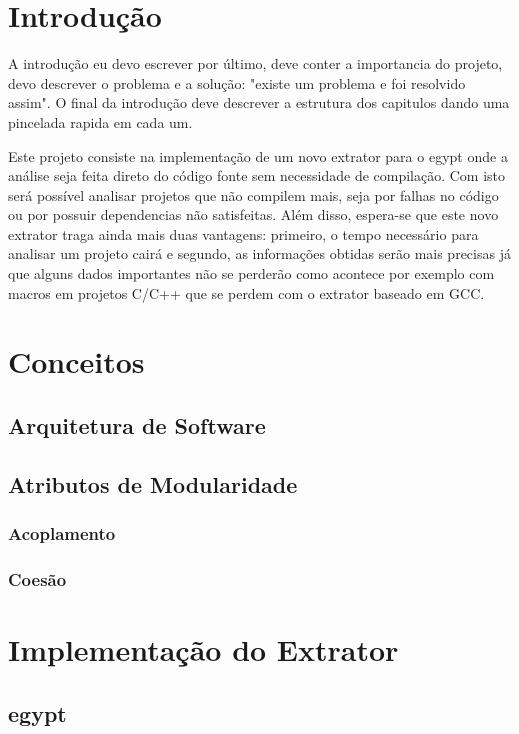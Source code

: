 \chapter{Introdução}

A introdução eu devo escrever por último, deve conter a importancia do projeto,
devo descrever o problema e a solução: "existe um problema e foi resolvido
assim". O final da introdução deve descrever a estrutura dos capitulos dando
uma pincelada rapida em cada um.

Este projeto consiste na implementação de um novo extrator para o egypt onde a
análise seja feita direto do código fonte sem necessidade de compilação. Com
isto será possível analisar projetos que não compilem mais, seja por falhas no
código ou por possuir dependencias não satisfeitas. Além disso, espera-se que
este novo extrator traga ainda mais duas vantagens: primeiro, o tempo
necessário para analisar um projeto cairá e segundo, as informações obtidas
serão mais precisas já que alguns dados importantes não se perderão como
acontece por exemplo com macros em projetos C/C++
\cite{SourceVersusObjectCodeExtraction} que se perdem com o extrator baseado em
GCC.

\chapter{Conceitos}
\section{Arquitetura de Software}
\section{Atributos de Modularidade}
\subsection{Acoplamento}
\subsection{Coesão}

\chapter{Implementação do Extrator}

\section{egypt}

